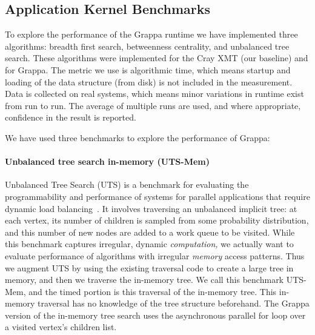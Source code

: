 \subsection{Application Kernel Benchmarks}

To explore the performance of the Grappa runtime we have implemented
three algorithms: breadth first search, betweenness centrality, and
unbalanced tree search.  These algorithms were implemented for the
Cray XMT (our baseline) and for Grappa.  The metric we use is
algorithmic time, which means startup and loading of the data
structure (from disk) is not included in the measurement.  Data is
collected on real systems, which means minor variations in runtime
exist from run to run.  The average of multiple runs are used, and
where appropriate, confidence in the result is reported.

We have used three benchmarks to explore the performance of Grappa:

\paragraph{Unbalanced tree search in-memory (UTS-Mem)} Unbalanced Tree
Search (UTS) is a benchmark for evaluating the programmability and
performance of systems for parallel applications that require dynamic
load balancing~\cite{UTS}. It involves traversing an
unbalanced implicit tree: at each vertex, its number of children is
sampled from some probability distribution, and this number of new nodes
are added to a work queue to be visited. While this benchmark captures
irregular, dynamic \emph{computation,} we actually want to evaluate
performance of algorithms with irregular \emph{memory\/} access patterns.
Thus we augment UTS by using the existing traversal code to create a
large tree in memory, and then we traverse the in-memory tree. We call
this benchmark UTS-Mem, and the timed portion is this traversal of the
in-memory tree. This in-memory traversal has no knowledge of the
tree structure beforehand.  The Grappa version of the in-memory tree
search uses the asynchronous parallel for loop over a visited vertex's
children list.

